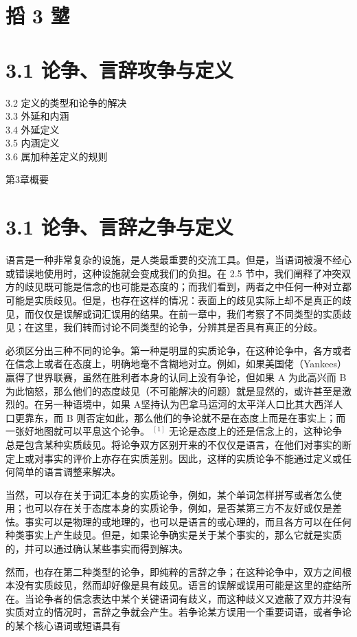\section*{搯 3 㙱}
\section*{3.1 论争、言辞攻争与定义}
3.2 定义的类型和论争的解决\\
3.3 外延和内涵\\
3.4 外延定义\\
3.5 内涵定义\\
3.6 属加种差定义的规则

第3章概要

\section*{3.1 论争、言辞之争与定义}
语言是一种非常复杂的设施，是人类最重要的交流工具。但是，当语词被漫不经心或错误地使用时，这种设施就会变成我们的负担。在 2.5 节中，我们阐释了冲突双方的歧见既可能是信念的也可能是态度的；而我们看到，两者之中任何一种对立都可能是实质歧见。但是，也存在这样的情况：表面上的歧见实际上却不是真正的歧见，而仅仅是误解或词汇误用的结果。在前一章中，我们考察了不同类型的实质歧见；在这里，我们转而讨论不同类型的论争，分辨其是否具有真正的分歧。

必须区分出三种不同的论争。第一种是明显的实质论争，在这种论争中，各方或者在信念上或者在态度上，明确地毫不含糊地对立。例如，如果美国佬（Yankees）赢得了世界联赛，虽然在胜利者本身的认同上没有争论，但如果 A 为此高兴而 B 为此恼怒，那么他们的态度歧见（不可能解决的问题）就是显然的，或许甚至是激烈的。在另一种语境中，如果 A坚持认为巴拿马运河的太平洋人口比其大西洋人口更靠东，而 B 则否定如此，那么他们的争论就不是在态度上而是在事实上；而一张好地图就可以平息这个论争。 ${ }^{[1]}$ 无论是态度上的还是信念上的，这种论争总是包含某种实质歧见。将论争双方区别开来的不仅仅是语言，在他们对事实的断定上或对事实的评价上亦存在实质差别。因此，这样的实质论争不能通过定义或任何简单的语言调整来解决。

当然，可以存在关于词汇本身的实质论争，例如，某个单词怎样拼写或者怎么使用；也可以存在关于态度本身的实质论争，例如，是否某第三方不友好或仅是差怯。事实可以是物理的或地理的，也可以是语言的或心理的，而且各方可以在任何种类事实上产生歧见。但是，如果论争确实是关于某个事实的，那么它就是实质的，并可以通过确认某些事实而得到解决。

然而，也存在第二种类型的论争，即纯粹的言辞之争；在这种论争中，双方之间根本没有实质歧见，然而却好像是具有歧见。语言的误解或误用可能是这里的症结所在。当论争者的信念表达中某个关键语词有歧义，而这种歧义又遮蔽了双方并没有实质对立的情况时，言辞之争就会产生。若争论某方误用一个重要词语，或者争论的某个核心语词或短语具有

